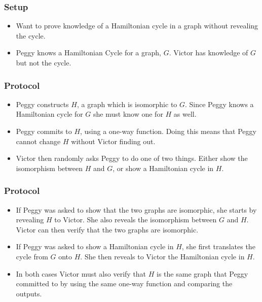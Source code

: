 \documentclass{beamer}
\begin{document}
\begin{frame}
	\frametitle{Setup}
	\begin{itemize}
		\item Want to prove knowledge of a Hamiltonian cycle in a graph without
		revealing the cycle.
		
		\item Peggy knows a Hamiltonian Cycle for a graph, $G$.
		Victor has knowledge of $G$ but not the cycle.
	\end{itemize}
\end{frame}

\begin{frame}
	\frametitle{Protocol}
	\begin{itemize}
		\item Peggy constructs $H$, a graph which
		is isomorphic to $G$. Since Peggy knows a Hamiltonian cycle
		for $G$ she must know one for $H$ as well.
		
		\item Peggy commits to $H$, using a one-way function. Doing this 
		means that Peggy cannot change $H$ without Victor finding	out.
		
		\item Victor then randomly asks Peggy to do one of two things. Either show
		the isomorphism between $H$ and $G$, or show a Hamiltonian cycle in $H$.		
	\end{itemize}
\end{frame}

\begin{frame}
	\frametitle{Protocol}
	\begin{itemize}
		\item If Peggy was asked to show that the two graphs are isomorphic, she
		starts by revealing $H$ to Victor. She also reveals the isomorphism between 
		$G$ and $H$. Victor can then verify that the two graphs are isomorphic.
		
		\item If Peggy was asked to show a Hamiltonian cycle in $H$, she first 
		translates the cycle from $G$ onto $H$. She then reveals to Victor the 
		Hamiltonian cycle in $H$. 
		
		\item In both cases Victor must also verify that $H$ is the same graph 
		that Peggy committed to by using the same one-way function and comparing 
		the outputs.
		
		
	\end{itemize}
\end{frame}
\end{document}
